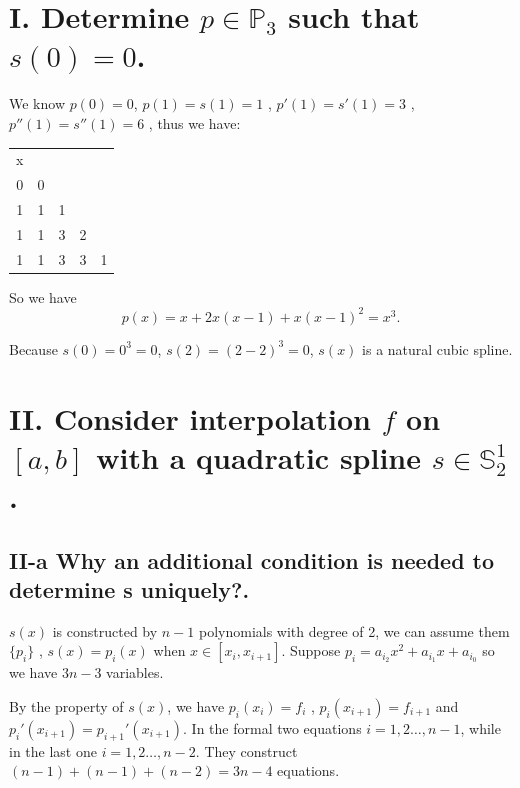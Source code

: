 \documentclass[twoside,a4paper]{article}
\begin{document}
\pagestyle{fancy}
\fancyhead{}


\section*{I. \small{Determine $p\in\mathbb{P}_3$ such that $s\left( 0 \right)=0 $.}}

We know $p\left( 0 \right)=0 $, $p\left( 1 \right)=s\left( 1 \right) =1 $
, $p'\left( 1 \right) =s'\left( 1 \right)=3 $
, $p''\left( 1 \right) =s''\left( 1 \right)=6 $
, thus we have:

\begin{tabular}{c|cccc}
x\\
0 &0\\
1 &1  &1\\
1 &1  &3  &2\\
1 &1  &3  &3 &1\\
\end{tabular}

So we have
\[
	p\left( x \right)=x+2x\left( x-1 \right)+x\left( x-1 \right)^2=x^{3}   
.\] 

Because $s\left(  0\right)=0^{3}=0 $, $s\left( 2 \right)=\left( 2-2 \right)^{3}=0  $, $s\left( x \right) $ is a natural cubic spline.

\section*{II. \small{Consider interpolation $f$ on  $[a,b]$ with a quadratic spline  $s\in\mathbb{S}^{1}_2$.}}

\subsection*{II-a \small{Why an additional condition is needed to determine s uniquely?.}}

$s\left( x \right) $ is constructed by $n-1$ polynomials with degree of 2, we can assume them $\{p_i\}$
, $s\left( x \right)=p_i\left( x \right)  $ when $x\in[x_{i},x_{i+1}]$.
Suppose $p_i=a_{i_2} x^2+a_{i_1} x+a_{i_0}$ so we have $3n-3$ variables. 

By the property of $s\left( x \right) $, we have $p_i\left( x_i \right)=f_i$ 
, $p_i\left( x_{i+1} \right)=f_{i+1}$
and $p_i'\left( x_{i+1} \right)=p_{i+1}'\left( x_{i+1} \right) $.
In the formal two equations $i=1,2\ldots,n-1$, while in the last one $i=1,2\ldots,n-2$. 
They construct $\left( n-1 \right)+\left( n-1 \right)+\left( n-2 \right)=3n-4$ equations.
\end{document}
